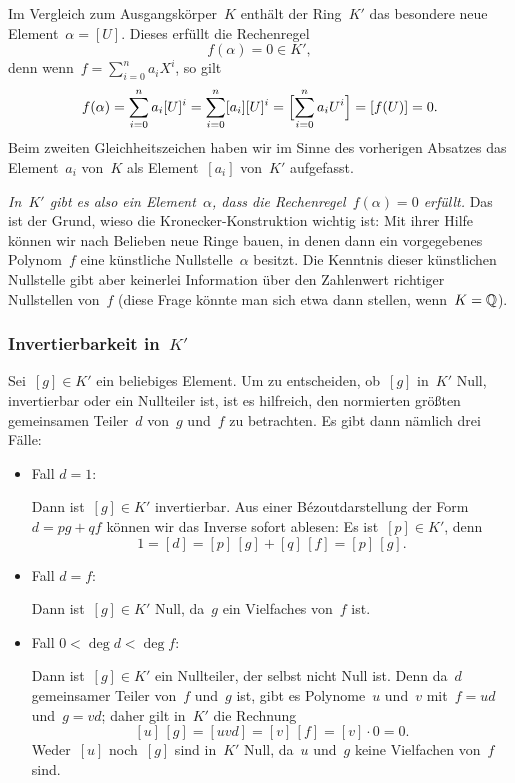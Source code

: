 \documentclass{../../alg2/algblatt}
\begin{document}
Im Vergleich zum Ausgangskörper~$K$ enthält der Ring~$K'$ das besondere neue
Element~$\alpha = [U]$. Dieses erfüllt die Rechenregel
\[ f(\alpha) = 0 \in K', \]
denn wenn~$f = \sum_{i=0}^n a_i X^i$, so gilt
\[ f(\alpha) = \sum_{i=0}^n a_i [U]^i = \sum_{i=0}^n [a_i] [U]^i =
  \Bigl[\sum_{i=0}^n a_i U^i\Bigr] = [f(U)] = 0. \]
Beim zweiten Gleichheitszeichen haben wir im Sinne des vorherigen Absatzes das
Element~$a_i$ von~$K$ als Element~$[a_i]$ von~$K'$ aufgefasst.

\emph{In~$K'$ gibt es also ein Element~$\alpha$, dass die
Rechenregel~$f(\alpha) = 0$ erfüllt.} Das ist der Grund, wieso die
Kronecker-Konstruktion wichtig ist: Mit ihrer Hilfe können wir
nach Belieben neue Ringe bauen, in denen dann ein vorgegebenes Polynom~$f$ eine
künstliche Nullstelle~$\alpha$ besitzt. Die Kenntnis dieser künstlichen
Nullstelle gibt aber keinerlei Information über den Zahlenwert richtiger
Nullstellen von~$f$ (diese Frage könnte man sich etwa dann stellen, wenn~$K =
\mathbb{Q}$).


\subsubsection*{Invertierbarkeit in~$K'$}

Sei~$[g] \in K'$ ein beliebiges Element. Um zu entscheiden, ob~$[g]$ in~$K'$
Null, invertierbar oder ein Nullteiler ist, ist es hilfreich, den normierten
größten gemeinsamen Teiler~$d$ von~$g$ und~$f$ zu betrachten. Es gibt dann
nämlich drei Fälle:
\begin{itemize}
\item Fall $d = 1$:

Dann ist~$[g] \in K'$ invertierbar. Aus einer
Bézoutdarstellung der Form~$d = pg + qf$ können wir das Inverse sofort ablesen:
Es ist~$[p] \in K'$, denn
\[ 1 = [d] = [p]\,[g] + [q]\,[f] = [p]\,[g]. \]

\item Fall $d = f$:

Dann ist~$[g] \in K'$ Null, da~$g$ ein Vielfaches von~$f$
ist.

\item Fall $0 < \deg d < \deg f$:

Dann ist~$[g] \in K'$ ein Nullteiler, der
selbst nicht Null ist. Denn da~$d$ gemeinsamer Teiler von~$f$ und~$g$ ist, gibt
es Polynome~$u$ und~$v$ mit~$f = ud$ und~$g = vd$; daher gilt in~$K'$ die
Rechnung
\[ [u]\,[g] = [uvd] = [v]\,[f] = [v]\cdot0 = 0. \]
Weder~$[u]$ noch~$[g]$ sind in~$K'$ Null, da~$u$ und~$g$ keine Vielfachen
von~$f$ sind.
\end{itemize}
\end{document}
